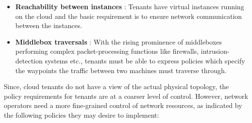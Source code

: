 \begin{itemize}
	\item \textbf{Reachability between instances} : Tenants have
          virtual instances running on the cloud and the basic
          requirement is to ensure network communication between the
          instances.
	\item \textbf{Middlebox traversals} : With the rising
          prominence of middleboxes performing complex
          packet-processing functions like firewalls,
          intrusion-detection systems etc., tenants must be able to
          express policies which specify the waypoints the traffic
          between two machines must traverse through.
\end{itemize}
Since, cloud tenants do not have a view of the actual physical
topology, the policy requirements for tenants are at a coarser level
of control. However, network operators need a more fine-grained
control of network resources, as indicated by the following policies
they may desire to implement:
